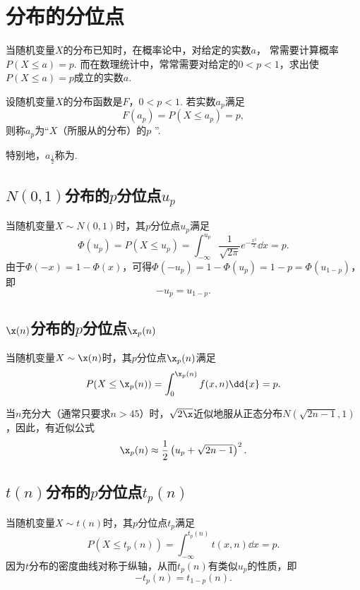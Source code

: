 


\section{分布的分位点}
当随机变量\(X\)的分布已知时，在概率论中，对给定的实数\(a\)，
常需要计算概率\(P(X \leq a) = p\).
而在数理统计中，常常需要对给定的\(0<p<1\)，求出使\(P(X \leq a) = p\)成立的实数\(a\).

\begin{definition}
设随机变量\(X\)的分布函数是\(F\)，\(0<p<1\).
若实数\(a_p\)满足\begin{equation}
	F(a_p) = P(X \leq a_p) = p,
\end{equation}
则称\(a_p\)为“\(X\)（所服从的分布）的\(p\) ”.

特别地，\(a_{\frac{1}{2}}\)称为.
\end{definition}

\subsection{\texorpdfstring{\(N(0,1)\)分布的\(p\)分位点\(u_p\)}{标准正态分布的p分位点}}
当随机变量\(X \sim N(0,1)\)时，其\(p\)分位点\(u_p\)满足\[
\Phi(u_p)
= P(X \leq u_p)
= \int_{-\infty}^{u_p} \frac{1}{\sqrt{2\pi}} e^{-\frac{x^2}{2}} \dd{x}
= p.
\]由于\(\Phi(-x)=1-\Phi(x)\)，可得\(\Phi(-u_p)=1-\Phi(u_p)=1-p=\Phi(u_{1-p})\)，即\begin{equation}
-u_p=u_{1-p}.
\end{equation}

\subsection{\texorpdfstring{\(\x(n)\)分布的\(p\)分位点\(\x_p(n)\)}{卡方分布的p分位点}}
当随机变量\(X \sim \x(n)\)时，其\(p\)分位点\(\x_p(n)\)满足\[
P(X \leq \x_p(n)) = \int_0^{\x_p(n)} f(x,n) \dd{x} = p.
\]

当\(n\)充分大（通常只要求\(n>45\)）时，\(\sqrt{2\x}\)近似地服从正态分布\(N(\sqrt{2n-1},1)\)，因此，有近似公式\begin{equation}
\x_p(n) \approx \frac{1}{2}\left(u_p+\sqrt{2n-1}\right)^2.
\end{equation}

\subsection{\texorpdfstring{\(t(n)\)分布的\(p\)分位点\(t_p(n)\)}{t分布的p分位点}}
当随机变量\(X \sim t(n)\)时，其\(p\)分位点\(t_p\)满足\[
P(X \leq t_p(n))
= \int_{-\infty}^{t_p(n)} t(x,n) \dd{x} = p.
\]因为\(t\)分布的密度曲线对称于纵轴，从而\(t_p(n)\)有类似\(u_p\)的性质，即\begin{equation}
-t_p(n)=t_{1-p}(n).
\end{equation}

